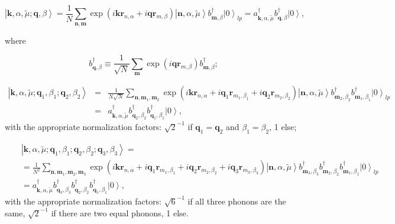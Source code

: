 \documentclass[pt12]{article}
\newcommand{\bfk}{\mathbf{k}}
\newcommand{\bfq}{\mathbf{q}}
\newcommand{\bfr}{\mathbf{r}}
\newcommand{\bfn}{\mathbf{n}}
\newcommand{\bfm}{\mathbf{m}}
\newcommand{\tmu}{\tilde{\mu}}
\begin{document}
\begin{equation}\label{1P_k_states}
\left|\textbf{k},\alpha, \tmu ; \textbf{q},\beta \right>=\frac{1}{N}
\sum_{\bfn,\bfm}{} \exp\left( i\bfk\bfr_{n,\alpha} +
i\bfq\bfr_{m,\beta} \right)\left|\textbf{n},\alpha, \tmu\right> b^\dagger_{\textbf{m},\beta}
\left|0\right>_{lp} = a^\dagger_{\bfk,\alpha,\tmu} b^\dagger_{\bfq,\beta}\left|0\right>,
\end{equation}

where

\begin{equation}\label{1P_k_states}
b^\dagger_{\bfq,\beta}\equiv \frac{1}{\sqrt{N}} \sum_{\bfm}{} \exp\left( i\bfq\bfr_{m,\beta} \right)b^\dagger_{\textbf{m},\beta} ;
\end{equation}

\begin{eqnarray}\label{2P_k_states}
\nonumber
\left|\textbf{k},\alpha, \tmu ; \textbf{q}_1,\beta_1 ;
\textbf{q}_2,\beta_2\right>&=&\frac{1}{N\sqrt{N}}
\sum_{\bfn,\bfm_1,\bfm_2}{} \exp\left( i\bfk\bfr_{n,\alpha} +
i\bfq_1\bfr_{m_1,\beta_1} + i\bfq_2\bfr_{m_2,\beta_2}
\right)\left|\textbf{n},\alpha, \tmu\right>
b^\dagger_{\textbf{m}_2,\beta_2}b^\dagger_{\textbf{m}_1,\beta_1}
\left|0\right>_{lp} \\
&=& a^\dagger_{\bfk,\alpha,\tmu} b^\dagger_{\bfq_2,\beta_2}b^\dagger_{\bfq_1,\beta_1}\left|0\right> ,
\end{eqnarray}
with the appropriate normalization factors: $\sqrt{2}^{-1}$ if
$\bfq_1=\bfq_2$ and $\beta_1=\beta_2$, 1 else;

\begin{eqnarray}\label{4P_k_states}
&&\left|\textbf{k},\alpha, \tmu ; \textbf{q}_1,\beta_1 ;
\textbf{q}_2,\beta_2; \textbf{q}_3,\beta_3\right>= \\ \nonumber
&&=\frac{1}{N^2} \sum_{\bfn,\bfm_1,\bfm_2,\bfm_3}{} \exp\left(
i\bfk\bfr_{n,\alpha} + i\bfq_1\bfr_{m_1,\beta_1} +
i\bfq_2\bfr_{m_2,\beta_2}+ i\bfq_3\bfr_{m_3,\beta_3}
\right)\left|\textbf{n},\alpha, \tmu\right>
b^\dagger_{\textbf{m}_3,\beta_3}b^\dagger_{\textbf{m}_2,\beta_2}b^\dagger_{\textbf{m}_1,\beta_1}
\left|0\right>_{lp}\\ \nonumber
&& = a^\dagger_{\bfk,\alpha,\tmu} b^\dagger_{\bfq_3,\beta_3} b^\dagger_{\bfq_2,\beta_2}b^\dagger_{\bfq_1,\beta_1}\left|0\right> ,
\end{eqnarray}
with the appropriate normalization factors: $\sqrt{6}^{-1}$ if all
three phonons are the same, $\sqrt{2}^{-1}$ if there are two equal
phonons, 1 else.
\end{document}
